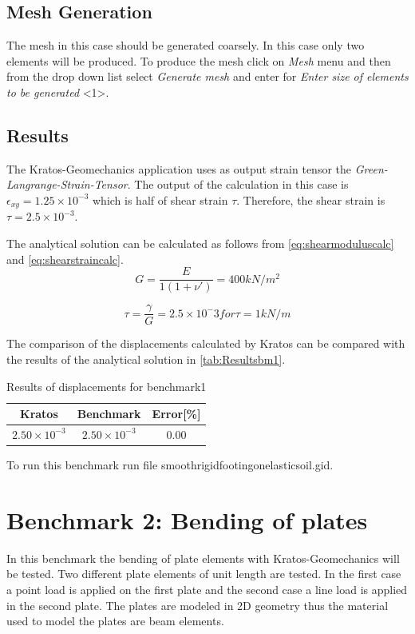 \documentclass{deltares_manual_style}
\begin{document}
\section{Mesh Generation}
The mesh in this case should be generated coarsely. In this case only two elements will be produced. To produce the mesh
click on \textit{Mesh} menu and then from the drop down list select \textit{Generate mesh} and enter for \textit{Enter
size of elements to be generated} <1>.  
\section{Results} 
 The Kratos-Geomechanics application uses as output strain tensor the \textit{Green-Langrange-Strain-Tensor}. The output of the calculation in this case is $\epsilon_{xy} = 1.25\times10^{-3}$ which is half of shear strain $\tau$.
Therefore, the shear strain is $\tau= 2.5\times10^{-3}$.

The analytical solution can be calculated as follows from \autoref{eq:shearmoduluscalc} and \autoref{eq:shearstraincalc}. 
\begin{equation} \label{eq:shearmoduluscalc}
G = \frac{E}{1( 1 + \nu')} = 400 kN/m^{2} 
\end{equation}

\begin{equation}\label{eq:shearstraincalc}
\tau = \frac{\gamma}{G} = 2.5\times10^-{3} for \tau=1 kN/m 
\end{equation}

The comparison of the displacements calculated by Kratos can be compared with the results of the analytical solution in
\autoref{tab:Resultsbm1}.

\begin{table}[H]
	\caption{Results of displacements for benchmark1 }
	\label{tab:Resultsbm1}
	\centering
		\begin{tabular}{|c|c|c|}
			\hline
			Kratos & Benchmark & Error[\%] \\ \hline
			$2.50\times10^{-3}$ & $2.50\times10^{-3}$ & $0.00$ \\ \hline
		\end{tabular}
\end{table}

To run this benchmark run file smoothrigidfootingonelasticsoil.gid.

\chapter{Benchmark 2: Bending of plates} \label{Bench2}
In this benchmark the bending of plate elements with Kratos-Geomechanics will be tested. Two different plate elements of 
unit length are tested. In the first case a point load is applied on the first plate and the second case 
a line load is applied in the second plate. The plates are modeled in 2D geometry thus the material used to model the
plates are beam elements.     
\end{document}
